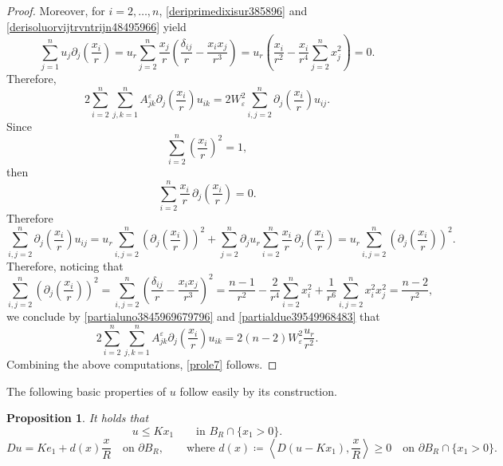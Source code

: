 \documentclass[11pt]{amsart}
\renewcommand{\leq}{\leqslant}
\renewcommand{\geq}{\geqslant}
\renewcommand{\ge}{>}
\newcommand{\eps}{\varepsilon}
\newcommand{\Ae}{A^\eps}
\newtheorem{proposition}[theorem]{Proposition}
\theoremstyle{definition}
\theoremstyle{remark}
\numberwithin{equation}{section}
\begin{document}
\begin{proof}
Moreover, for $i=2,\ldots,n$, \eqref{deriprimedixisur385896} and \eqref{derisoluorvijtrvntrijn48495966} yield
\begin{equation*}
\sum_{j=1}^n u_j
\partial_j\left(\frac{x_i}{r}\right)
=
u_r\sum_{j=2}^n\frac{x_j}{r}
\left(\frac{\delta_{ij}}r-\frac{x_i x_j}{r^3}\right)=
u_r\left(
\frac{x_i}{r^2}
-\frac{x_i}{r^4}\sum_{j=2}^n x_j^2
\right)
=0.
\end{equation*}
Therefore,
\begin{equation}\label{partialuno3845969679796}
2\sum_{i=2}^n\sum_{j,k=1}^n
\Ae_{jk}
\partial_j\left(\frac{x_i}{r}\right)u_{ik}=
2W_\varepsilon^2
\sum_{i,j=2}^n
\partial_j\left(\frac{x_i}{r}\right)u_{ij}.
\end{equation}
Since
\[
\sum_{i=2}^n\left(\frac{x_i}{r}\right)^2=1,
\]
then
\[
\sum_{i=2}^n
\frac{x_i}{r}\,
\partial_j\left(\frac{x_i}{r}\right)
=0.
\]
Therefore
\begin{equation}\label{partialdue39549968483}
\sum_{i,j=2}^n
\partial_j\left(\frac{x_i}{r}\right)u_{ij}
=
u_r\sum_{i,j=2}^n
\left(
\partial_j\left(\frac{x_i}{r}\right)
\right)^2
+
\sum_{j=2}^n\partial_j u_r
\sum_{i=2}^n
\frac{x_i}{r}\,
\partial_j\left(\frac{x_i}{r}\right)
=
u_r\sum_{i,j=2}^n
\left(
\partial_j\left(\frac{x_i}{r}\right)
\right)^2.
\end{equation}
Therefore, noticing that 
\begin{equation*}
\sum_{i,j=2}^n
\left(
\partial_j\left(\frac{x_i}{r}\right)
\right)^2=
\sum_{i,j=2}^n
\left(\frac{\delta_{ij}}r-\frac{x_i x_j}{r^3}\right)^2=
\frac{n-1}{r^2}
-\frac{2}{r^4}\sum_{i=2}^n x_i^2
+\frac1{r^6}
\sum_{i,j=2}^n x_i^2x_j^2=\frac{n-2}{r^2},
\end{equation*}
we conclude by \eqref{partialuno3845969679796} and \eqref{partialdue39549968483} that 
\[
2\sum_{i=2}^n\sum_{j,k=1}^n
\Ae_{jk}
\partial_j\left(\frac{x_i}{r}\right)u_{ik}
=
2(n-2)W_\varepsilon^2\frac{u_r}{r^2}.
\]
Combining the above computations, \eqref{prole7} follows.
\end{proof}
The following basic properties of $u$ follow easily by its construction.
\begin{proposition}\label{prop:mono-boundary}
It holds that 
\begin{equation}\label{eq:mono-basic}
    u\leq Kx_1\qquad\text{in }B_R\cap\{x_1>0\}.
\end{equation}
\begin{equation}\label{eq:mono-boundary}
 Du=Ke_1+d(x)\frac{x}{R}\quad \text{on }\partial B_R,\qquad \text{where }d(x)\coloneqq \left\langle D(u-Kx_1),\frac{x}{R}\right\rangle\geq 0\quad\text{on } \partial B_R\cap \{x_1\ge 0\}.
\end{equation}
\end{proposition}
\end{document}

